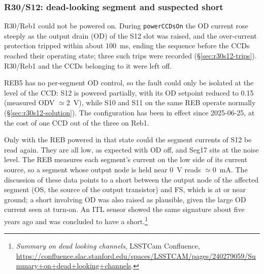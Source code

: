 
\subsubsection{R30/S12: dead-looking segment and suspected short}
\label{sec:r30s12}

R30/Reb1 could not be powered on. During \texttt{powerCCDsOn} the OD current
rose steeply as the output drain (OD) of the S12 slot was raised, and the
over-current protection tripped within about 100~ms, ending the sequence
before the CCDs reached their operating state; three such trips were recorded
(\S\ref{sec:r30s12-trips}). R30/Reb1 and the CCDs belonging to it were left
off.

REB5 has no per-segment OD control, so the fault could only be isolated at the
level of the CCD: S12 is powered partially, with its OD setpoint reduced to
0.15 (measured ODV $\simeq2$~V), while S10 and S11 on the same REB operate
normally (\S\ref{sec:r30s12-solution}). The configuration has been in effect
since 2025-06-25, at the cost of one CCD out of the three on Reb1.

Only with the REB powered in that state could the segment currents of S12 be
read again. They are all low, as expected with OD off, and Seg17 sits at the
noise level. The REB measures each segment's current on the low side of its
current source, so a segment whose output node is held near 0~V reads
$\simeq0$~mA. The discussion of these data points to a short between the
output node of the affected segment (OS, the source of the output transistor)
and FS, which is at or near ground; a short involving OD was also raised as
plausible, given the large OD current seen at turn-on. An ITL sensor showed
the same signature about five years ago and was concluded to have a
short.\footnote{\emph{Summary on dead looking channels}, LSSTCam Confluence,
\url{https://confluence.slac.stanford.edu/spaces/LSSTCAM/pages/240279059/Summary+on+dead+looking+channels}.}

